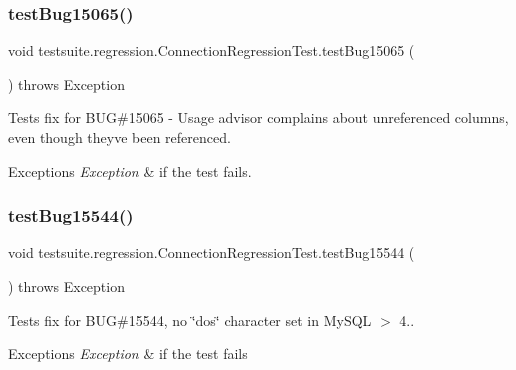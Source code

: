 \subsubsection{\texorpdfstring{test\+Bug15065()}{testBug15065()}}
{\footnotesize\ttfamily void testsuite.\+regression.\+Connection\+Regression\+Test.\+test\+Bug15065 (\begin{DoxyParamCaption}{ }\end{DoxyParamCaption}) throws Exception}

Tests fix for B\+UG\#15065 -\/ Usage advisor complains about unreferenced columns, even though they\textquotesingle{}ve been referenced.


\begin{DoxyExceptions}{Exceptions}
{\em Exception} & if the test fails. \\
\hline
\end{DoxyExceptions}
\mbox{\label{classtestsuite_1_1regression_1_1_connection_regression_test_aeed00da9768a6a691550e641b5b02b8c}} 
\subsubsection{\texorpdfstring{test\+Bug15544()}{testBug15544()}}
{\footnotesize\ttfamily void testsuite.\+regression.\+Connection\+Regression\+Test.\+test\+Bug15544 (\begin{DoxyParamCaption}{ }\end{DoxyParamCaption}) throws Exception}

Tests fix for B\+UG\#15544, no \char`\"{}dos\char`\"{} character set in My\+S\+QL $>$ 4..


\begin{DoxyExceptions}{Exceptions}
{\em Exception} & if the test fails \\
\hline
\end{DoxyExceptions}
\mbox{\label{classtestsuite_1_1regression_1_1_connection_regression_test_a9a041d23bb6273cd7e366bede52eea56}} 
